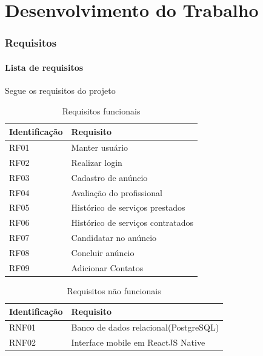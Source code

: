 
\chapter{Desenvolvimento do Trabalho}

\subsection{Requisitos}
\subsubsection{Lista de requisitos}
Segue os requisitos do projeto
\begin{table}[htb]
	\centering
	\caption{\label{Formatação do texto.}Requisitos funcionais}
	\begin{tabular}{|l|p{11cm}|}
	\hline
	\textbf{Identificação} & \textbf{Requisito}\\ \hline
	RF01 & Manter usuário \\ \hline
	RF02 & Realizar login \\ \hline
	RF03 & Cadastro de anúncio \\ \hline
	RF04 & Avaliação do profissional\\ \hline
	RF05 & Histórico de serviços prestados \\ \hline
	RF06 & Histórico de serviços contratados \\ \hline
	RF07 & Candidatar no anúncio \\ \hline
	RF08 & Concluir anúncio \\ \hline
	RF09 & Adicionar Contatos \\ \hline
	\end{tabular}
\end{table}

\begin{table}[htb]
	\centering
	\caption{\label{Formatação do texto.}Requisitos não funcionais}
	\begin{tabular}{|l|p{11cm}|}
	\hline
	\textbf{Identificação}    & \textbf{Requisito}\\ \hline
	RNF01        			  & Banco de dados relacional(PostgreSQL)\\ \hline
	RNF02        			  & Interface mobile em ReactJS Native\\ \hline
	\end{tabular}
\end{table}
\clearpage
